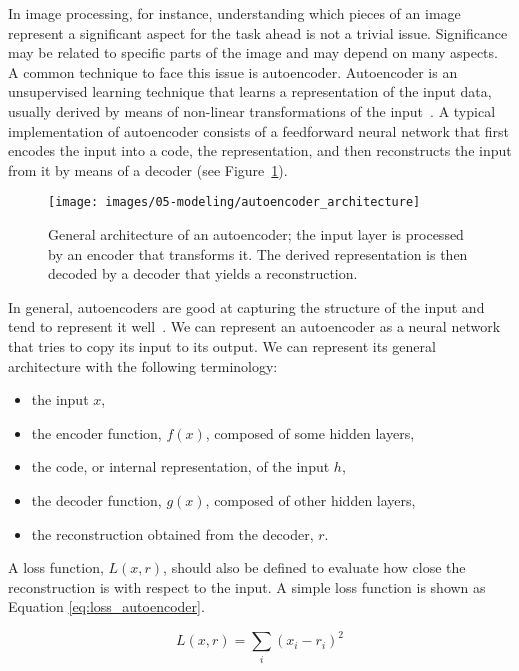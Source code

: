 In image processing, for instance, understanding which pieces of an image represent a significant aspect for the task ahead is not a trivial issue. Significance may be related to specific parts of the image and may depend on many aspects. A common technique to face this issue is {autoencoder}.
Autoencoder is an unsupervised learning technique that learns a representation of the input data, usually derived by means of non-linear transformations of the input~\cite{goodfellow_deep_2016}.
A typical implementation of autoencoder consists of a feedforward neural network that first encodes the input into a code, the representation, and then reconstructs the input from it by means of a decoder (see Figure~\ref{fig:autoencoder_architecture}).

\begin{figure}[H]
\centering
\texttt{[image: images/05-modeling/autoencoder\_architecture]}
\caption[Autoencoder general architecture]{General architecture of an autoencoder; the input layer is processed by an encoder that transforms it. The derived representation is then decoded by a decoder that yields a reconstruction.}
\label{fig:autoencoder_architecture}
\end{figure}

In general, autoencoders are good at capturing the structure of the input and tend to represent it well~\cite{goodfellow_deep_2016}. We can represent an autoencoder as a neural network that tries to copy its input to its output. We can represent its general architecture with the following terminology:
\begin{itemize}[leftmargin=*,labelsep=5.8mm]
	\item the input $x$,
  \item the {encoder function}, $f(x)$, composed of some hidden layers,
  \item the {code}, or internal representation, of the input $h$,
  \item the {decoder function}, $g(x)$, composed of other hidden layers,
  \item the reconstruction obtained from the decoder, $r$.
\end{itemize}

A {loss function}, $L(x, r)$, should also be defined to evaluate how close the reconstruction is with respect to the input.
A simple loss function is shown as Equation \eqref{eq:loss_autoencoder}.

\begin{equation} \label{eq:loss_autoencoder}
L(x,r) = \sum_{i} (x_i - r_i)^2
\end{equation}

